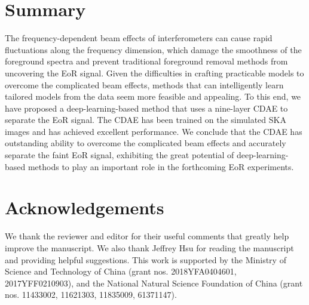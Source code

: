 \documentclass[fleqn,usenatbib]{mnras}
\begin{document}
\section{Summary}
\label{sec:summary}

The frequency-dependent beam effects of interferometers can cause
rapid fluctuations along the frequency dimension,
which damage the smoothness of the foreground spectra and prevent
traditional foreground removal methods from uncovering the EoR signal.
Given the difficulties in crafting practicable models to overcome the
complicated beam effects, methods that can intelligently learn tailored
models from the data seem more feasible and appealing.
To this end, we have proposed a deep-learning-based method that uses
a nine-layer CDAE to separate the EoR signal.
The CDAE has been trained on the simulated SKA images and has achieved
excellent performance.
We conclude that the CDAE has outstanding ability to overcome the
complicated beam effects and accurately separate the faint EoR signal,
exhibiting the great potential of deep-learning-based methods
to play an important role in the forthcoming EoR experiments.


\section*{Acknowledgements}

We thank the reviewer and editor for their useful comments that
greatly help improve the manuscript.
We also thank Jeffrey Hsu for reading the manuscript and providing
helpful suggestions.
This work is supported by
the Ministry of Science and Technology of China
(grant nos\@. 2018YFA0404601, 2017YFF0210903),
and the National Natural Science Foundation of China
(grant nos\@. 11433002, 11621303, 11835009, 61371147).










\bsp	%
\label{lastpage}
\end{document}
